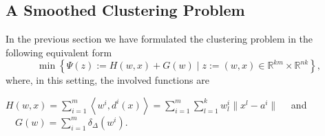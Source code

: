 \documentclass[12pt]{article}
\numberwithin{equation}{section}
\begin{document}
%


\subsection{A Smoothed Clustering Problem}

In the previous section we have formulated the clustering problem in the following equivalent form
\begin{equation*}
	\min \left\lbrace \Psi(z) := H(w,x) + G(w) \mid z := (w,x) \in \mathbb{R}^{km} \times \mathbb{R}^{nk} \right\rbrace ,
\end{equation*}
where, in this setting, the involved functions are
\begin{center}
$H(w,x) = \sum\limits_{i=1}^{m} \left\langle w^i , d^i(x) \right\rangle
	= \sum\limits_{i=1}^{m} \sum\limits_{l=1}^{k} w^i_l \| x^l - a^i \| \quad$
and 
$\quad G(w) = \sum\limits_{i=1}^{m} \delta_{\Delta}(w^i)$.
\end{center}
\end{document}
